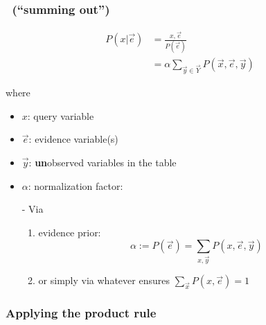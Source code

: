 \begin{frame}\frametitle{\subsubsecname~(``summing out'')}


\begin{align}
P(x | \vec e)
&= \frac{x, \vec e}{P(\vec e)}\\
&= \alpha \sum_{\vec y \in \vec Y} P(\vec x, \vec e, \vec y)
\end{align}

where
\begin{itemize}
\item[] $x$: query variable
\item[] $\vec e$: evidence variable(s)
\item[] $\vec y$: \textbf{un}observed variables in the table
\item[] $\alpha$: normalization factor:


- Via
\begin{enumerate}
\item evidence prior:
\begin{equation}
\alpha := P(\vec e) = \sum_{x, \vec y} P(x, \vec e, \vec y)  
\end{equation}
\item or simply via whatever ensures $\sum_{\vec x} P(x, \vec e) = 1$
\end{enumerate}

\end{itemize}
    
\end{frame}

\subsubsection{Applying the product rule}

